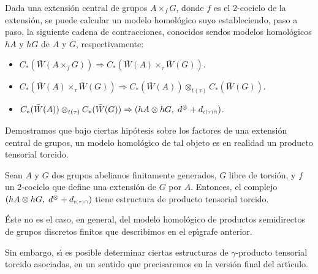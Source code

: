Dada una extensi\'{o}n central de grupos $A \times _f G$, donde $f$
es el 2-cociclo de la extensi\'{o}n, se puede calcular un modelo
homol\'{o}gico suyo estableciendo, paso a paso, la siguiente cadena
de contracciones, conocidos sendos modelos homol\'{o}gicos $hA$ y
$hG$ de $A$ y $G$, respectivamente:
\begin{itemize}
\item $C_*(\bar{W}(A\times_f G))\Rightarrow C_*(\bar{W}(A)\times_\tau
\bar{W}(G))$.
\item $C_*(\bar{W}(A)\times_\tau \bar{W}(G))\Rightarrow
C_*(\bar{W}(A))\otimes_{t(\tau)}C_*(\bar{W}(G)) $.
\item $C_*(\bar{W}(A))\otimes_{t(\tau)}C_*(\bar{W}(G))\Rightarrow (hA\otimes hG, \;d^\otimes+
d_{\scriptscriptstyle t(\tau)\cap})$.
\end{itemize}

Demostramos que bajo ciertas
hip\'{o}tesis sobre los factores de una extensi\'{o}n central de
grupos, un modelo homol\'{o}gico de tal objeto es en realidad un
producto tensorial torcido.

\begin{thr}
Sean $A$ y $G$ dos grupos abelianos finitamente generados, $G$
libre de torsi\'{o}n, y $f$ un 2-cociclo que define una extensi\'{o}n
de $G$ por $A$. Entonces, el complejo $(hA\otimes hG, \;d^\otimes+
d_{\scriptscriptstyle t(\tau)\cap})$ tiene estructura de producto tensorial
torcido.
\end{thr}

\'{E}ste no es el caso, en general, del modelo homol\'{o}gico de productos
semidirectos de grupos discretos finitos que describimos en el ep\'{\i}grafe
anterior.

Sin embargo, s\'{\i} es posible determinar ciertas estructuras de
$\gamma$-producto tensorial torcido asociadas, en un sentido que
precisaremos en la versi\'{o}n final del art\'{\i}culo.

